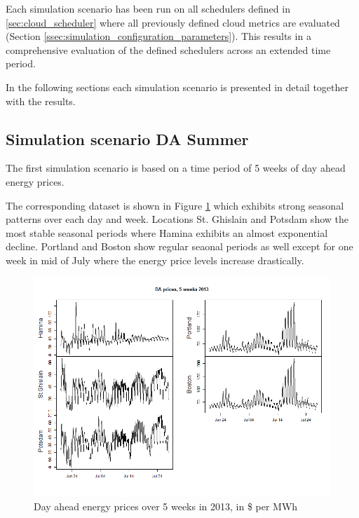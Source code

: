 Each simulation scenario has been run on all schedulers defined in \ref{sec:cloud_scheduler} where all previously defined cloud metrics are evaluated (Section \ref{ssec:simulation_configuration_parameters}). This results in a comprehensive evaluation of the defined schedulers across an extended time period. 

In the following sections each simulation scenario is presented in detail together with the results. 



\subsection{Simulation scenario DA Summer} \label{ssec:simulation_scenario_da_summer}

The first simulation scenario is based on a time period of 5 weeks of day ahead energy prices. 

The corresponding dataset is shown in Figure \ref{fig:da_sim_2013_5weeks} which exhibits strong seasonal patterns over each day and week. Locations St. Ghislain and Potsdam show the most stable seasonal periods where Hamina exhibits an almost exponential decline. Portland and Boston show regular seaonal periods as well except for one week in mid of July where the energy price levels increase drastically. 

\begin{figure}[htbp]
	\centering
	\vspace*{-0.4in}
		\includegraphics[width=1.0\textwidth]{figures/evaluation_and_results/da_sim_2013_5weeks.png}
	\caption{Day ahead energy prices over 5 weeks in 2013, in \$ per MWh}
	\label{fig:da_sim_2013_5weeks}
\end{figure}

